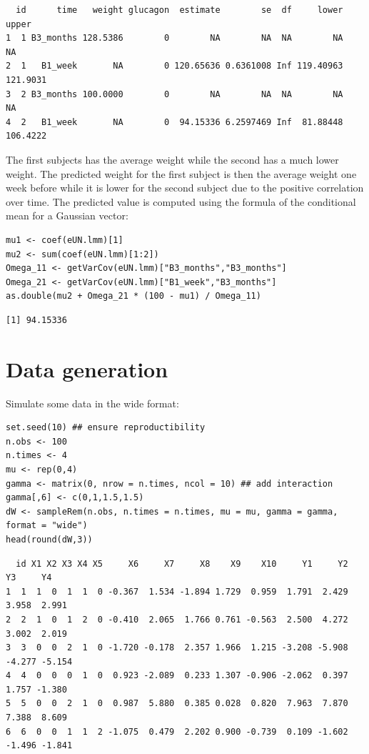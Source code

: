 \documentclass[12pt]{article}
\begin{document}
\begin{verbatim}
  id      time   weight glucagon  estimate        se  df     lower    upper
1  1 B3_months 128.5386        0        NA        NA  NA        NA       NA
2  1   B1_week       NA        0 120.65636 0.6361008 Inf 119.40963 121.9031
3  2 B3_months 100.0000        0        NA        NA  NA        NA       NA
4  2   B1_week       NA        0  94.15336 6.2597469 Inf  81.88448 106.4222
\end{verbatim}


The first subjects has the average weight while the second has a much
  lower weight. The predicted weight for the first subject is then the
  average weight one week before while it is lower for the second
  subject due to the positive correlation over time. The predicted
  value is computed using the formula of the conditional mean for a
  Gaussian vector:
\lstset{language=r,label= ,caption= ,captionpos=b,numbers=none}
\begin{lstlisting}
mu1 <- coef(eUN.lmm)[1]
mu2 <- sum(coef(eUN.lmm)[1:2])
Omega_11 <- getVarCov(eUN.lmm)["B3_months","B3_months"]
Omega_21 <- getVarCov(eUN.lmm)["B1_week","B3_months"]
as.double(mu2 + Omega_21 * (100 - mu1) / Omega_11)
\end{lstlisting}

\begin{verbatim}
[1] 94.15336
\end{verbatim}



\clearpage

\section{Data generation}
\label{sec:orgb9505d6}
Simulate some data in the wide format:
\lstset{language=r,label= ,caption= ,captionpos=b,numbers=none}
\begin{lstlisting}
set.seed(10) ## ensure reproductibility
n.obs <- 100
n.times <- 4
mu <- rep(0,4)
gamma <- matrix(0, nrow = n.times, ncol = 10) ## add interaction
gamma[,6] <- c(0,1,1.5,1.5)
dW <- sampleRem(n.obs, n.times = n.times, mu = mu, gamma = gamma, format = "wide")
head(round(dW,3))
\end{lstlisting}

\begin{verbatim}
  id X1 X2 X3 X4 X5     X6     X7     X8    X9    X10     Y1     Y2     Y3     Y4
1  1  1  0  1  1  0 -0.367  1.534 -1.894 1.729  0.959  1.791  2.429  3.958  2.991
2  2  1  0  1  2  0 -0.410  2.065  1.766 0.761 -0.563  2.500  4.272  3.002  2.019
3  3  0  0  2  1  0 -1.720 -0.178  2.357 1.966  1.215 -3.208 -5.908 -4.277 -5.154
4  4  0  0  0  1  0  0.923 -2.089  0.233 1.307 -0.906 -2.062  0.397  1.757 -1.380
5  5  0  0  2  1  0  0.987  5.880  0.385 0.028  0.820  7.963  7.870  7.388  8.609
6  6  0  0  1  1  2 -1.075  0.479  2.202 0.900 -0.739  0.109 -1.602 -1.496 -1.841
\end{verbatim}
\end{document}
